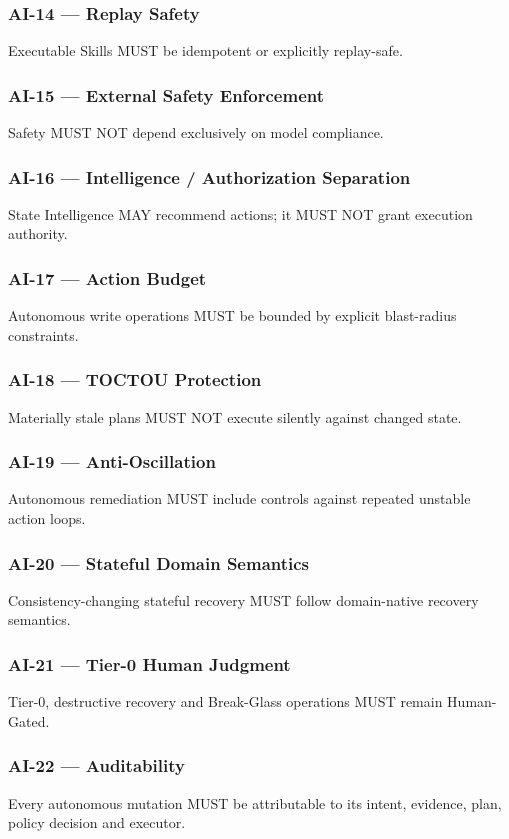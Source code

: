 \documentclass[11pt,a4paper]{article}
\begin{document}
\subsubsection{AI-14 — Replay Safety}
Executable Skills MUST be idempotent or explicitly replay-safe.

\subsubsection{AI-15 — External Safety Enforcement}
Safety MUST NOT depend exclusively on model compliance.

\subsubsection{AI-16 — Intelligence / Authorization Separation}
State Intelligence MAY recommend actions; it MUST NOT grant execution authority.

\subsubsection{AI-17 — Action Budget}
Autonomous write operations MUST be bounded by explicit blast-radius constraints.

\subsubsection{AI-18 — TOCTOU Protection}
Materially stale plans MUST NOT execute silently against changed state.

\subsubsection{AI-19 — Anti-Oscillation}
Autonomous remediation MUST include controls against repeated unstable action loops.

\subsubsection{AI-20 — Stateful Domain Semantics}
Consistency-changing stateful recovery MUST follow domain-native recovery semantics.

\subsubsection{AI-21 — Tier-0 Human Judgment}
Tier-0, destructive recovery and Break-Glass operations MUST remain Human-Gated.

\subsubsection{AI-22 — Auditability}
Every autonomous mutation MUST be attributable to its intent, evidence, plan, policy decision and executor.
\end{document}
